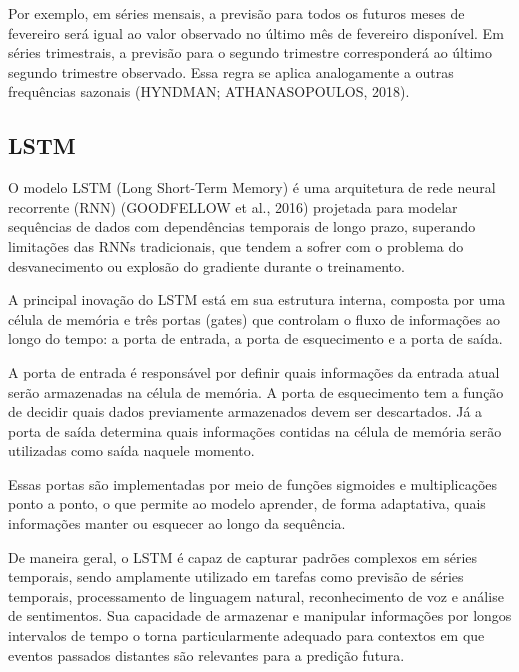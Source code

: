 \documentclass[
  12pt,
  a4paper,
]{scrreprt}
\begin{document}
\vspace{12pt}

Por exemplo, em séries mensais, a previsão para todos os futuros meses
de fevereiro será igual ao valor observado no último mês de fevereiro
disponível. Em séries trimestrais, a previsão para o segundo trimestre
corresponderá ao último segundo trimestre observado. Essa regra se
aplica analogamente a outras frequências sazonais (HYNDMAN;
ATHANASOPOULOS, 2018).

\subsection{LSTM}\label{lstm}

O modelo LSTM (Long Short-Term Memory) é uma arquitetura de rede neural
recorrente (RNN) (GOODFELLOW et al., 2016) projetada para modelar
sequências de dados com dependências temporais de longo prazo, superando
limitações das RNNs tradicionais, que tendem a sofrer com o problema do
desvanecimento ou explosão do gradiente durante o treinamento.

\vspace{12pt}

A principal inovação do LSTM está em sua estrutura interna, composta por
uma célula de memória e três portas (gates) que controlam o fluxo de
informações ao longo do tempo: a porta de entrada, a porta de
esquecimento e a porta de saída.

\vspace{12pt}

A porta de entrada é responsável por definir quais informações da
entrada atual serão armazenadas na célula de memória. A porta de
esquecimento tem a função de decidir quais dados previamente armazenados
devem ser descartados. Já a porta de saída determina quais informações
contidas na célula de memória serão utilizadas como saída naquele
momento.

\vspace{12pt}

Essas portas são implementadas por meio de funções sigmoides e
multiplicações ponto a ponto, o que permite ao modelo aprender, de forma
adaptativa, quais informações manter ou esquecer ao longo da sequência.

\vspace{12pt}

De maneira geral, o LSTM é capaz de capturar padrões complexos em séries
temporais, sendo amplamente utilizado em tarefas como previsão de séries
temporais, processamento de linguagem natural, reconhecimento de voz e
análise de sentimentos. Sua capacidade de armazenar e manipular
informações por longos intervalos de tempo o torna particularmente
adequado para contextos em que eventos passados distantes são relevantes
para a predição futura.
\end{document}
